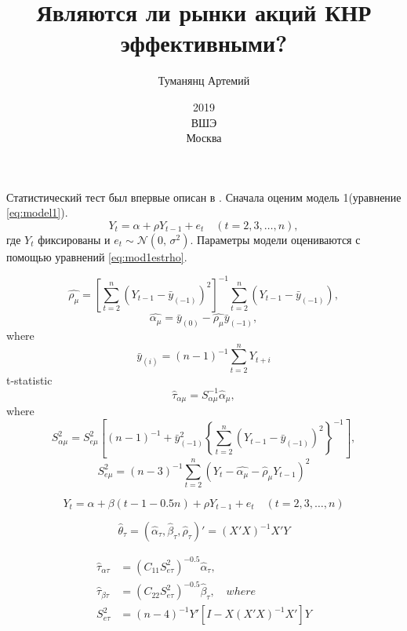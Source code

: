 \documentclass[a4paper,12pt]{article}
\title{Являются ли рынки акций КНР эффективными?}
\author{Туманянц Артемий}
\date{2019\\ВШЭ\\Москва}
\begin{document}
	Статистический тест был впервые описан в \cite{Dickey1981}. Сначала оценим модель 1(уравнение \ref{eq:model1}).
	\begin{equation}
		Y_t=\alpha+\rho Y_{t-1}+e_t\quad (t=2,3,\ldots,n),
		\label{eq:model1}
	\end{equation}
где $Y_t$ фиксированы и $e_t \sim \mathcal{N}(0,\,\sigma^{2})$. Параметры модели оцениваются с помощью уравнений \ref{eq:mod1estrho}.

	\begin{equation}
		\hat{\rho_\mu}=\left[\sum_{t=2}^n (Y_{t-1}-\bar{y}_{(-1)})^2\right]^{-1}
		\sum_{t=2}^n \left(Y_{t-1}-\bar{y}_{(-1)}\right),
		\label{eq:mod1estrho}
	\end{equation}
	\begin{equation}
		\hat{\alpha_\mu}=\bar{y}_{(0)}-\hat{\rho_\mu}\bar{y}_{(-1)},
	\end{equation}
	where
	\begin{equation}
		\bar{y}_(i)=(n-1)^{-1}\sum_{t=2}^{n}Y_{t+i}
	\end{equation}
	t-statistic
	\begin{equation}
		\hat{\tau}_{\alpha\mu}=S^{-1}_{\alpha\mu}\hat{\alpha}_\mu,
		\label{eq:mod1tau}
	\end{equation}
	where
	\begin{equation}
	S^2_{\alpha\mu}=S^2_{e\mu}
	\left[ (n-1)^{-1}+\bar{y}^2_{(-1)}
	\left\{
	\sum_{t=2}^{n}(Y_{t-1}-\bar{y}_{(-1)})^2\right\}^{-1}\right],
	\end{equation}
	\begin{equation}
	S^2_{e\mu}=(n-3)^{-1}\sum_{t=2}^{n}(Y_t-\hat{\alpha_\mu}-\hat{\rho}_\mu Y_{t-1})^2
	\end{equation}

	\begin{equation}
		\label{model2}
		Y_t=\alpha+\beta(t-1-0.5n)+\rho Y_{t-1}+e_t\quad (t=2,3,\ldots,n)
	\end{equation}

	\begin{equation}
		\hat{\theta}_\tau=(\hat{\alpha}_\tau,\hat{\beta}_\tau,\hat{\rho}_\tau)'=(X'X)^{-1}X'Y
	\end{equation}

	\begin{align}
		\label{mod2taualpha}
		\hat{\tau}_{\alpha\tau}&=(C_{11}S^2_{e\tau})^{-0.5}\hat{\alpha}_\tau,\\
		\label{mod2taubeta}
		\hat{\tau}_{\beta\tau}&=(C_{22}S^2_{e\tau})^{-0.5}\hat{\beta}_\tau,\quad where\\
		S^2_{e\tau}&=(n-4)^{-1}Y'\left[I-X(X'X)^{-1}X'\right]Y
	\end{align}
\end{document}
